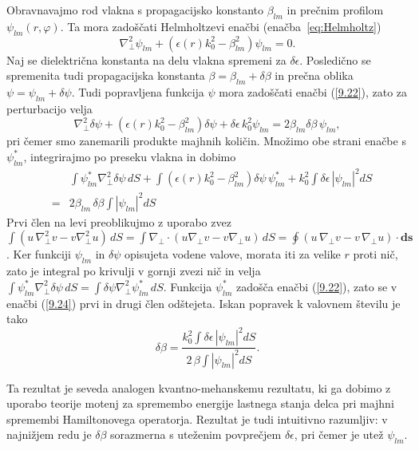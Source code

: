 Obravnavajmo rod vlakna s propagacijsko konstanto $\beta_{lm}$ in prečnim
profilom $\psi_{lm}\left(r,\varphi\right).$ Ta mora zadoščati Helmholtzevi enačbi 
(enačba~\ref{eq:Helmholtz})
\begin{equation}
\nabla_{\bot}^{2}\psi_{lm}+\left(\epsilon(r)k_{0}^{2}-\beta_{lm}^{2}\right)\psi_{lm}=0.
\label{9.22}
\end{equation}
Naj se dielektrična konstanta na delu vlakna spremeni za $\delta\epsilon.$
Posledično se spremenita tudi propagacijska konstanta $\beta=\beta_{lm}+\delta\beta$
in prečna oblika $\psi=\psi_{lm}+\delta\psi.$ Tudi popravljena funkcija
$\psi$ mora zadoščati enačbi (\ref{9.22}), zato za perturbacijo velja
\begin{equation}
\nabla_{\bot}^{2}\delta\psi+\left(\epsilon(r)k_{0}^{2}-\beta_{lm}^{2}\right)\delta\psi+
\delta\epsilon\, k_{0}^{2}\psi_{lm}=2\beta_{lm}\delta\beta\,\psi_{lm},
\label{9.23}
\end{equation}
pri čemer smo zanemarili produkte majhnih količin. Množimo obe strani
enačbe s $\psi_{lm}^{*}$, integrirajmo po preseku vlakna in dobimo
\begin{eqnarray}
 &  & \int\psi_{lm}^{*}\nabla_{\bot}^{2}\delta\psi\,
 dS+\int\left(\epsilon(r)k_{0}^{2}-\beta_{lm}^{2}\right)
 \delta\psi\,\psi_{lm}^{*}+k_{0}^{2}\int\delta\epsilon\,\left|\psi_{lm}\right|^{2}dS\label{9.24}\\
 & = & 2\beta_{lm}\,\delta\beta\int\left|\psi_{lm}\right|^{2}dS
\end{eqnarray}
Prvi člen na levi preoblikujmo z uporabo zvez $\int(u\,\nabla_{\bot}^{2}v-v\nabla_{\bot}^{2}u)\,
dS=\int\nabla_{\bot}\cdot(u\nabla_{\bot}v-v\nabla_{\bot}u)\, 
dS=\oint (u\,\nabla_{\bot}v-v\,\nabla_{\bot}u)\cdot \mathbf{ds}$.
Ker funkciji $\psi_{lm}$ in $\delta\psi$ opisujeta vodene valove,
morata iti za velike $r$ proti nič, zato je integral po krivulji
v gornji zvezi nič in velja $\int\psi_{lm}^{*}\nabla_{\bot}^{2}\delta\psi\,
dS=\int\delta\psi\nabla_{\bot}^{2}\psi_{lm}^{*}\, dS$.
Funkcija $\psi_{lm}^{*}$ zadošča enačbi (\ref{9.22}), zato se v enačbi (\ref{9.24})
prvi in drugi člen odštejeta. Iskan popravek k valovnem številu je tako 
\begin{equation}
\delta\beta=\frac{k_{0}^{2}\int\delta\epsilon\,\left|\psi_{lm}\right|^{2}dS}{2\,
\beta\int\left|\psi_{lm}\right|^{2}dS}.
\label{9.25}
\end{equation}
\begin{remark}
Ta rezultat je seveda analogen kvantno-mehanskemu rezultatu, ki ga dobimo 
z uporabo teorije motenj za spremembo energije lastnega stanja delca pri majhni 
spremembi Hamiltonovega operatorja. Rezultat je tudi intuitivno razumljiv: v
najnižjem redu je $\delta\beta$ sorazmerna s uteženim povprečjem
$\delta\epsilon$, pri čemer je utež $\psi_{lm}$.
\end{remark}

